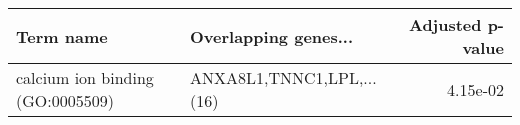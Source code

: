 \begin{tabular}{llr}
\toprule
                       Term name &      Overlapping genes... &  Adjusted p-value \\
\midrule
calcium ion binding (GO:0005509) & ANXA8L1,TNNC1,LPL,...(16) &          4.15e-02 \\
\bottomrule
\end{tabular}
